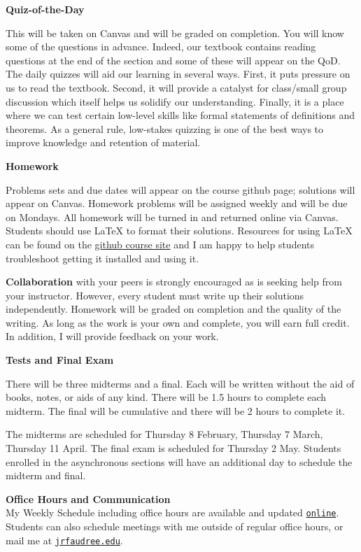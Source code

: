 \documentclass[12pt]{article}
\renewcommand{\emph}[1]{\textsf{\textbf{#1}}}
\newcommand{\localhead}[1]{\par\smallskip\textbf{#1}\nobreak\\}%
\def\heading#1{\localhead{\large\emph{#1}}}
\begin{document}
{\textbf{\large{Quiz-of-the-Day}}}

This will be taken on Canvas and will be graded on completion. You will know some of the questions in advance. Indeed, our textbook contains reading questions at the end of the section and some of these will appear on the QoD. The daily quizzes will aid our learning in several ways. First, it puts pressure on us to read the textbook. Second, it will provide a catalyst for class/small group discussion which itself helps us solidify our understanding. Finally, it is a place where we can test certain low-level skills like formal statements of definitions and theorems. As a general rule, low-stakes quizzing is one of the best ways to improve knowledge and retention of material.
\newpage

{\textbf{\large{Homework}}}

Problems sets and due dates will appear on the course github page; solutions will appear on Canvas. Homework problems will be assigned weekly and will be due on Mondays. All homework will be turned in and returned online via Canvas. Students should use  \LaTeX \: to format their solutions.  Resources for using \LaTeX \: can be found on the  \href{https://jrfaudree.github.io/M663f23/}{github course site} and I am happy to help students troubleshoot getting it installed and using it.

 \textbf{Collaboration} with your peers is strongly encouraged as is seeking help from your instructor. However, every student must write up their solutions independently. Homework will be graded on completion and the quality of the writing. As long as the work is your own and complete, you will earn full credit. In addition, I will provide feedback on your work.

{\textbf{\large{Tests and Final Exam}}}

There will be three midterms and a final. Each will be written without the aid of books, notes, or aids of any kind. There will be 1.5 hours to complete each midterm. The final will be cumulative and there will be 2 hours to complete it.

The midterms are scheduled for Thursday 8 February, Thursday 7 March, Thursday 11 April. The final exam is scheduled for Thursday 2 May. Students enrolled in the asynchronous sections will have an additional day to schedule the midterm and final.

\heading{Office Hours and Communication}
My Weekly Schedule including office hours are available and updated \href{https://docs.google.com/spreadsheets/d/e/2PACX-1vRhaXnUrTdqObpUN21MDpirpEBAEBPnD4c3LFUqLrP4Rx4NrqHoW0YSGfzS75CE6Af6ndjNiO9H8EPg/pubhtml?gid=0&single=true}{\texttt{online}}.  Students can also schedule meetings with me outside of regular office hours, or mail me at \href{mailto:jrfaudree@alaska.edu}{\texttt{jrfaudree\@@alaska.edu}}.
\end{document}
